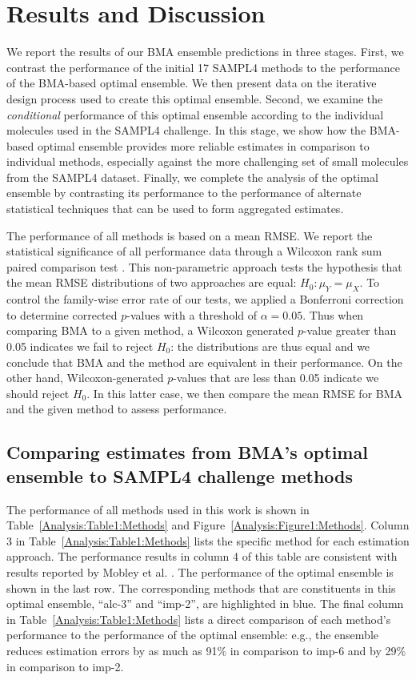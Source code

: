 \documentclass[journal=jpcbfk, manuscript=article]{achemso}
\newcommand{\+}[1]{\ensuremath{\mathbf{#1}}}
\begin{document}
\section{Results and Discussion} \label{Results}
We report the results of our BMA ensemble predictions in three stages.
First, we contrast the performance of the initial 17 SAMPL4 methods to the performance of the BMA-based optimal ensemble.
We then present data on the iterative design process used to create this optimal ensemble.
Second, we examine the \emph{conditional} performance of this optimal ensemble according to the individual molecules used in the SAMPL4 challenge.
In this stage, we show how the BMA-based optimal ensemble provides more reliable estimates in comparison to individual methods, especially against the more challenging set of small molecules from the SAMPL4 dataset.
Finally, we complete the analysis of the optimal ensemble by contrasting its performance to the performance of alternate statistical techniques that can be used to form aggregated estimates. 

The performance of all methods is based on a mean RMSE.
We report the statistical significance of all performance data through a Wilcoxon rank sum paired comparison test \cite{Wilcoxon:45}.
This non-parametric approach tests the hypothesis that the mean RMSE distributions of two approaches are equal: $H_0 : \mu_Y = \mu_X$.
To control the family-wise error rate of our tests, we applied a Bonferroni correction to determine corrected $p$-values with a threshold of $\alpha = 0.05$.
Thus when comparing BMA to a given method, a Wilcoxon generated $p$-value greater than 0.05 indicates we fail to reject $H_0$: the distributions are thus equal and we conclude that BMA and the method are equivalent in their performance.
On the other hand, Wilcoxon-generated $p$-values that are less than 0.05 indicate we should reject $H_0$.
In this latter case, we then compare the mean RMSE for BMA and the given method to assess performance.

\subsection{Comparing estimates from BMA's optimal ensemble to SAMPL4 challenge methods} \label{Results:BMA_Methods}
The performance of all methods used in this work is shown in Table~\ref{Analysis:Table1:Methods} and Figure~\ref{Analysis:Figure1:Methods}.
Column 3 in Table~\ref{Analysis:Table1:Methods} lists the specific method for each estimation approach.
The performance results in column 4 of this table are consistent with results reported by Mobley et al. \cite{Mobley:2014}.
The performance of the optimal ensemble is shown in the last row.
The corresponding methods that are constituents in this optimal ensemble, ``alc-3'' and ``imp-2'', are highlighted in blue.
The final column in Table~\ref{Analysis:Table1:Methods} lists a direct comparison of each method's performance to the performance of the optimal ensemble: e.g., the ensemble reduces estimation errors by as much as 91\% in comparison to imp-6 and by 29\% in comparison to imp-2. 
\end{document}
